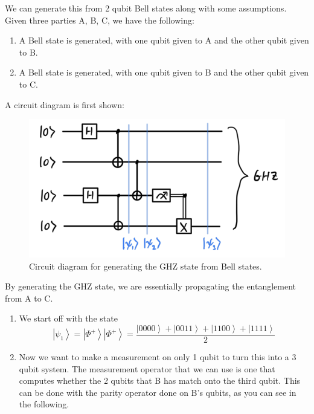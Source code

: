 \documentclass{article}
\newcommand{\ket}[1]{\ensuremath{\left|#1\right\rangle}}
\begin{document}
    \begin{theorem}
      We can generate this from 2 qubit Bell states along with some assumptions. Given three parties A, B, C, we have the following: 
      \begin{enumerate} 
        \item A Bell state is generated, with one qubit given to A and the other qubit given to B. 
        \item A Bell state is generated, with one qubit given to B and the other qubit given to C. 
      \end{enumerate}
      A circuit diagram is first shown: 
      \begin{figure}[H]
        \centering 
        \includegraphics[scale=0.4]{img/propagating_entanglement.png}
        \caption{Circuit diagram for generating the GHZ state from Bell states.} 
        \label{fig:propagating_entanglement}
      \end{figure}
      By generating the GHZ state, we are essentially propagating the entanglement from A to C. 
      \begin{enumerate} 
        \item We start off with the state 
          \begin{equation} 
            \ket{\psi_1} = \ket{\Phi^+} \ket{\Phi^+} = \frac{\ket{0000} + \ket{0011} + \ket{1100} + \ket{1111}}{2}
          \end{equation}
        \item Now we want to make a measurement on only 1 qubit to turn this into a 3 qubit system. The measurement operator that we can use is one that computes whether the 2 qubits that B has match onto the third qubit. This can be done with the parity operator done on B's qubits, as you can see in the following. 
          \begin{align} 

\end{align}
\end{enumerate}
\end{theorem}
\end{document}
